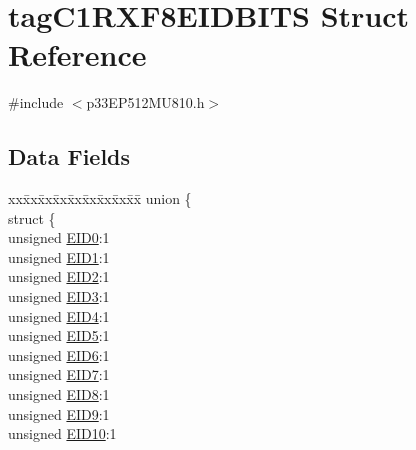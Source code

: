 \hypertarget{structtag_c1_r_x_f8_e_i_d_b_i_t_s}{}\section{tag\+C1\+R\+X\+F8\+E\+I\+D\+B\+I\+TS Struct Reference}
\label{structtag_c1_r_x_f8_e_i_d_b_i_t_s}


{\ttfamily \#include $<$p33\+E\+P512\+M\+U810.\+h$>$}

\subsection*{Data Fields}
\begin{DoxyCompactItemize}
\item 
\begin{tabbing}
xx\=xx\=xx\=xx\=xx\=xx\=xx\=xx\=xx\=\kill
union \{\\
\>struct \{\\
\>\>unsigned \hyperlink{structtag_c1_r_x_f8_e_i_d_b_i_t_s_a9da8b7b30247e4f9cd8cc056549aa9fd}{EID0}:1\\
\>\>unsigned \hyperlink{structtag_c1_r_x_f8_e_i_d_b_i_t_s_afd6c139491d147c1262f3d051c6691e9}{EID1}:1\\
\>\>unsigned \hyperlink{structtag_c1_r_x_f8_e_i_d_b_i_t_s_a36ec62d8d3c5acd5d15e6691dc099a94}{EID2}:1\\
\>\>unsigned \hyperlink{structtag_c1_r_x_f8_e_i_d_b_i_t_s_ab895f7d0ac289a0383b607cbc62eebe2}{EID3}:1\\
\>\>unsigned \hyperlink{structtag_c1_r_x_f8_e_i_d_b_i_t_s_a136d5a709d6618d40acceccb43036656}{EID4}:1\\
\>\>unsigned \hyperlink{structtag_c1_r_x_f8_e_i_d_b_i_t_s_a8dffb2d86a6c184df505ae7c71a58710}{EID5}:1\\
\>\>unsigned \hyperlink{structtag_c1_r_x_f8_e_i_d_b_i_t_s_af8a8574102515d8f1a4b7fd1685d0532}{EID6}:1\\
\>\>unsigned \hyperlink{structtag_c1_r_x_f8_e_i_d_b_i_t_s_a84c3262e67f8d5fd387ac10bde6fa9b1}{EID7}:1\\
\>\>unsigned \hyperlink{structtag_c1_r_x_f8_e_i_d_b_i_t_s_acca25e0b7d86eb499d01f85222baea87}{EID8}:1\\
\>\>unsigned \hyperlink{structtag_c1_r_x_f8_e_i_d_b_i_t_s_ac6748f73d4ada8538b06548be4f396c2}{EID9}:1\\
\>\>unsigned \hyperlink{structtag_c1_r_x_f8_e_i_d_b_i_t_s_a9cea8e77ecbb72bd3b08102412793725}{EID10}:1\\

\end{tabbing}
\end{DoxyCompactItemize}
